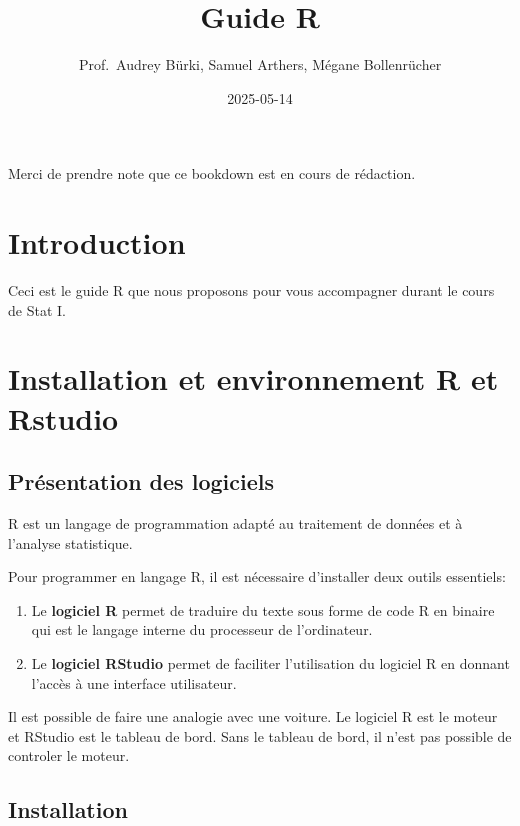 \documentclass[
]{book}
\title{Guide R}
\author{Prof.~Audrey Bürki, Samuel Arthers, Mégane Bollenrücher}
\date{2025-05-14}
\providecommand{\tightlist}{%
  \setlength{\itemsep}{0pt}\setlength{\parskip}{0pt}}
\begin{document}
\maketitle

{
\setcounter{tocdepth}{1}
\tableofcontents
}
Merci de prendre note que ce bookdown est en cours de rédaction.

\chapter{Introduction}\label{introduction}

Ceci est le guide R que nous proposons pour vous accompagner durant le cours de Stat I.

\chapter{Installation et environnement R et Rstudio}\label{installation-et-environnement-r-et-rstudio}

\section{Présentation des logiciels}\label{pruxe9sentation-des-logiciels}

R est un langage de programmation adapté au traitement de données et à l'analyse statistique.

Pour programmer en langage R, il est nécessaire d'installer deux outils essentiels:

\begin{enumerate}
\def\labelenumi{\arabic{enumi}.}
\tightlist
\item
  Le \textbf{logiciel R} permet de traduire du texte sous forme de code R en binaire qui est le langage interne du processeur de l'ordinateur.
\item
  Le \textbf{logiciel RStudio} permet de faciliter l'utilisation du logiciel R en donnant l'accès à une interface utilisateur.
\end{enumerate}

Il est possible de faire une analogie avec une voiture. Le logiciel R est le moteur et RStudio est le tableau de bord. Sans le tableau de bord, il n'est pas possible de controler le moteur.

\section{Installation}\label{installation}
\end{document}
